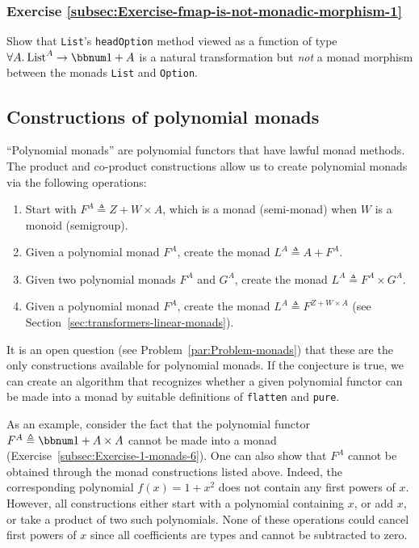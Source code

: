 \subsubsection{Exercise \label{subsec:Exercise-fmap-is-not-monadic-morphism-1}\ref{subsec:Exercise-fmap-is-not-monadic-morphism-1}}

Show that \lstinline!List!\textsf{'}s \lstinline!headOption! method viewed
as a function of type $\forall A.\:\text{List}^{A}\rightarrow\bbnum 1+A$
is a natural transformation but \emph{not} a monad morphism between
the monads \lstinline!List! and \lstinline!Option!.

\subsection{Constructions of polynomial monads\label{subsec:Constructions-of-polynomial-monads}}

\textsf{``}Polynomial monads\textsf{''} are polynomial functors that have lawful monad
methods. The product and co-product constructions allow us to create
polynomial monads via the following operations:
\begin{enumerate}
\item Start with $F^{A}\triangleq Z+W\times A$, which is a monad (semi-monad)
when $W$ is a monoid (semigroup).
\item Given a polynomial monad $F^{A}$, create the monad $L^{A}\triangleq A+F^{A}$.
\item Given two polynomial monads $F^{A}$ and $G^{A}$, create the monad
$L^{A}\triangleq F^{A}\times G^{A}$.
\item Given a polynomial monad $F^{A}$, create the monad $L^{A}\triangleq F^{Z+W\times A}$
(see Section~\ref{sec:transformers-linear-monads}).
\end{enumerate}
It is an open question (see Problem~\ref{par:Problem-monads}) that
these are the only constructions available for polynomial monads.
If the conjecture is true, we can create an algorithm that recognizes
whether a given polynomial functor can be made into a monad by suitable
definitions of \lstinline!flatten! and \lstinline!pure!. 

As an example, consider the fact that the polynomial functor $F^{A}\triangleq\bbnum 1+A\times A$
cannot be made into a monad (Exercise~\ref{subsec:Exercise-1-monads-6}).
One can also show that $F^{A}$ cannot be obtained through the monad
constructions listed above. Indeed, the corresponding polynomial $f(x)=1+x^{2}$
does not contain any first powers of $x$. However, all constructions
either start with a polynomial containing $x$, or add $x$, or take
a product of two such polynomials. None of these operations could
cancel first powers of $x$ since all coefficients are types and cannot
be subtracted to zero.

